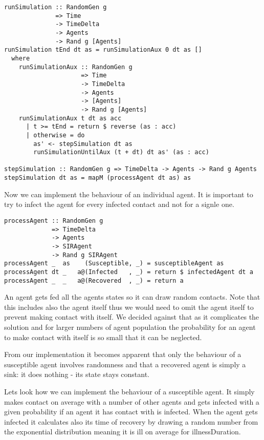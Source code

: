 \begin{verbatim}
runSimulation :: RandomGen g 
              => Time 
              -> TimeDelta 
              -> Agents 
              -> Rand g [Agents]
runSimulation tEnd dt as = runSimulationAux 0 dt as []
  where
    runSimulationAux :: RandomGen g 
                     => Time 
                     -> TimeDelta 
                     -> Agents 
                     -> [Agents] 
                     -> Rand g [Agents]
    runSimulationAux t dt as acc
      | t >= tEnd = return $ reverse (as : acc)
      | otherwise = do
        as' <- stepSimulation dt as 
        runSimulationUntilAux (t + dt) dt as' (as : acc)

stepSimulation :: RandomGen g => TimeDelta -> Agents -> Rand g Agents
stepSimulation dt as = mapM (processAgent dt as) as
\end{verbatim}

Now we can implement the behaviour of an individual agent.
It is important to try to infect the agent for every infected contact and not for a signle one.

\begin{verbatim}
processAgent :: RandomGen g 
             => TimeDelta 
             -> Agents 
             -> SIRAgent 
             -> Rand g SIRAgent
processAgent _  as    (Susceptible, _) = susceptibleAgent as
processAgent dt _   a@(Infected   , _) = return $ infectedAgent dt a
processAgent _  _   a@(Recovered  , _) = return a
\end{verbatim}

An agent gets fed all the agents states so it can draw random contacts. Note that this includes also the agent itself thus we would need to omit the agent itself to prevent making contact with itself. We decided against that as it complicates the solution and for larger numbers of agent population the probability for an agent to make contact with itself is so small that it can be neglected.

From our implementation it becomes apparent that only the behaviour of a susceptible agent involves randomness and that a recovered agent is simply a sink: it does nothing - its state stays constant.

Lets look how we can implement the behaviour of a susceptible agent. It simply makes contact on average with a number of other agents and gets infected with a given probability if an agent it has contact with is infected.
When the agent gets infected it calculates also its time of recovery by drawing a random number from the exponential distribution meaning it is ill on average for illnessDuration.

